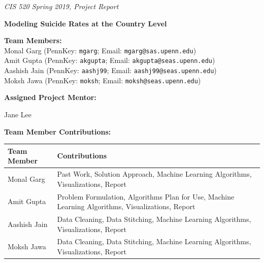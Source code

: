 \documentclass{article}
\begin{document}



\emph{\footnotesize{CIS 520 Spring 2019, Project Report}}


\vspace{12pt}

\textbf{\Large{Modeling Suicide Rates at the Country Level}}

\vspace{1cm}

\textbf{Team Members:} \\
Monal Garg (PennKey: \texttt{mgarg}; Email: \texttt{mgarg@sas.upenn.edu}) \\
Amit Gupta (PennKey: \texttt{akgupta}; Email: \texttt{akgupta@seas.upenn.edu}) \\
Aashish Jain (PennKey: \texttt{aashj99}; Email: \texttt{aashj99@seas.upenn.edu}) \\
Moksh Jawa (PennKey: \texttt{moksh}; Email: \texttt{moksh@seas.upenn.edu})


\vspace{2cm}


\textbf{Assigned Project Mentor:}

Jane Lee

\vspace{1cm}

\textbf{Team Member Contributions:}

\begin{center}
\begin{tabular}{|l|l|}
\hline
Team Member & Contributions \\
\hline
Monal Garg & Past Work, Solution Approach, Machine Learning Algorithms, Visualizations, Report \\
\hline
Amit Gupta & Problem Formulation, Algorithms Plan for Use, Machine Learning Algorithms, Visualizations, Report \\
\hline
Aashish Jain & Data Cleaning, Data Stitching, Machine Learning Algorithms, Visualizations, Report \\
\hline
Moksh Jawa & Data Cleaning, Data Stitching, Machine Learning Algorithms, Visualizations, Report \\
\hline
\end{tabular}
\end{center}
\end{document}
